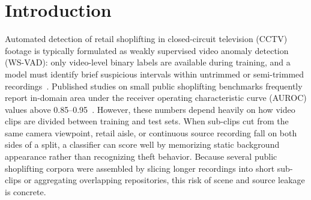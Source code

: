 \documentclass[pdflatex,sn-mathphys-num]{sn-jnl}
\begin{document}

\maketitle

\section{Introduction}\label{sec:intro}

Automated detection of retail shoplifting in closed-circuit television (CCTV) footage is typically formulated as weakly supervised video anomaly detection (WS-VAD): only video-level binary labels are available during training, and a model must identify brief suspicious intervals within untrimmed or semi-trimmed recordings~\cite{sultani2018,tian2021}. Published studies on small public shoplifting benchmarks frequently report in-domain area under the receiver operating characteristic curve (AUROC) values above 0.85--0.95~\cite{ansari2022esar}. However, these numbers depend heavily on how video clips are divided between training and test sets. When sub-clips cut from the same camera viewpoint, retail aisle, or continuous source recording fall on both sides of a split, a classifier can score well by memorizing static background appearance rather than recognizing theft behavior. Because several public shoplifting corpora were assembled by slicing longer recordings into short sub-clips or aggregating overlapping repositories, this risk of scene and source leakage is concrete.
\end{document}
